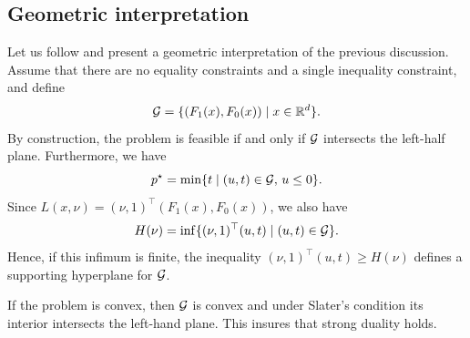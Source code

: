 \documentclass{report}
\begin{document}
\subsection*{Geometric interpretation}

Let us follow \cite[Section~5.3]{boydConvex2023} and present a geometric interpretation of the previous discussion.
% 
% 
Assume that there are no equality constraints and a single inequality constraint, and define 
\begin{equation}
	\mathcal{G} = \{ (F_1(x), F_0(x)) \mid x\in \mathbb{R}^d\}.
\end{equation}
By construction, the problem is feasible if and only if $\mathcal{G}$ intersects the left-half plane.
Furthermore, we have
\begin{equation}
	p^\star  = \min\{ t \mid (u,t)\in \mathcal{G},\, u\le 0\}.
\end{equation}
Since $L(x,\nu) = (\nu,1)^\top (F_1(x),F_0(x))$, we also have 
\begin{equation}
	H(\nu) = \inf \{  (\nu,1)^\top (u,t) \mid (u,t)\in \mathcal{G} \}.
\end{equation}
Hence, if this infimum is finite, the inequality $(\nu,1)^\top (u,t)\ge H(\nu)$ defines a supporting hyperplane for $\mathcal{G}$. 

If the problem is convex, then $\mathcal{G}$ is convex and under Slater's condition its interior intersects the left-hand plane. This insures that strong duality holds.
\end{document}
